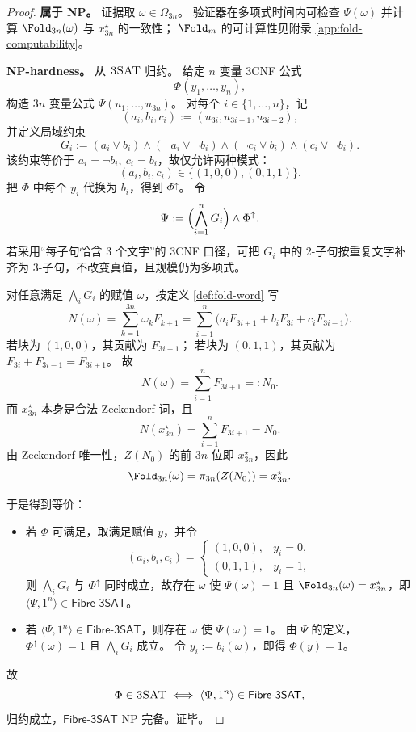 \begin{proof}
\textbf{属于 NP。}
证据取 \(\omega\in\Omega_{3n}\)。
验证器在多项式时间内可检查 \(\Psi(\omega)\) 并计算 \(\Fold_{3n}(\omega)\) 与 \(x^\star_{3n}\) 的一致性；
\(\Fold_m\) 的可计算性见附录 \ref{app:fold-computability}。
\par
\textbf{NP-hardness。}
从 \(\textsc{3SAT}\) 归约。
给定 \(n\) 变量 3CNF 公式
\[
\Phi(y_1,\dots,y_n),
\]
构造 \(3n\) 变量公式 \(\Psi(u_1,\dots,u_{3n})\)。
对每个 \(i\in\{1,\dots,n\}\)，记
\[
(a_i,b_i,c_i):=(u_{3i},u_{3i-1},u_{3i-2}),
\]
并定义局域约束
\[
G_i:=
(a_i\vee b_i)\wedge(\neg a_i\vee\neg b_i)
\wedge(\neg c_i\vee b_i)\wedge(c_i\vee\neg b_i).
\]
该约束等价于 \(a_i=\neg b_i,\ c_i=b_i\)，故仅允许两种模式：
\[
(a_i,b_i,c_i)\in\{(1,0,0),(0,1,1)\}.
\]
把 \(\Phi\) 中每个 \(y_i\) 代换为 \(b_i\)，得到 \(\Phi^\uparrow\)。
令
\[
\Psi:=\Bigl(\bigwedge_{i=1}^{n}G_i\Bigr)\wedge \Phi^\uparrow.
\]
若采用“每子句恰含 3 个文字”的 3CNF 口径，可把 \(G_i\) 中的 2-子句按重复文字补齐为 3-子句，不改变真值，且规模仍为多项式。

对任意满足 \(\bigwedge_i G_i\) 的赋值 \(\omega\)，按定义 \ref{def:fold-word} 写
\[
N(\omega)=\sum_{k=1}^{3n}\omega_kF_{k+1}
=\sum_{i=1}^{n}\bigl(a_iF_{3i+1}+b_iF_{3i}+c_iF_{3i-1}\bigr).
\]
若块为 \((1,0,0)\)，其贡献为 \(F_{3i+1}\)；
若块为 \((0,1,1)\)，其贡献为 \(F_{3i}+F_{3i-1}=F_{3i+1}\)。
故
\[
N(\omega)=\sum_{i=1}^{n}F_{3i+1}=:N_0.
\]
而 \(x^\star_{3n}\) 本身是合法 Zeckendorf 词，且
\[
N(x^\star_{3n})=\sum_{i=1}^{n}F_{3i+1}=N_0.
\]
由 Zeckendorf 唯一性，\(Z(N_0)\) 的前 \(3n\) 位即 \(x^\star_{3n}\)，因此
\[
\Fold_{3n}(\omega)=\pi_{3n}(Z(N_0))=x^\star_{3n}.
\]

于是得到等价：
\begin{itemize}
  \item 若 \(\Phi\) 可满足，取满足赋值 \(y\)，并令
  \[
  (a_i,b_i,c_i)=
  \begin{cases}
  (1,0,0),& y_i=0,\\
  (0,1,1),& y_i=1,
  \end{cases}
  \]
  则 \(\bigwedge_i G_i\) 与 \(\Phi^\uparrow\) 同时成立，故存在 \(\omega\) 使
  \(
  \Psi(\omega)=1
  \)
  且
  \(
  \Fold_{3n}(\omega)=x^\star_{3n}
  \)，即
  \(
  \langle\Psi,1^n\rangle\in\textsf{Fibre-3SAT}
  \)。
  \item 若 \(\langle\Psi,1^n\rangle\in\textsf{Fibre-3SAT}\)，则存在 \(\omega\) 使 \(\Psi(\omega)=1\)。
  由 \(\Psi\) 的定义，\(\Phi^\uparrow(\omega)=1\) 且 \(\bigwedge_i G_i\) 成立。
  令 \(y_i:=b_i(\omega)\)，即得 \(\Phi(y)=1\)。
\end{itemize}
故
\[
\Phi\in\textsc{3SAT}
\iff
\langle\Psi,1^n\rangle\in\textsf{Fibre-3SAT},
\]
归约成立，\(\textsf{Fibre-3SAT}\) NP 完备。证毕。
\end{proof}

